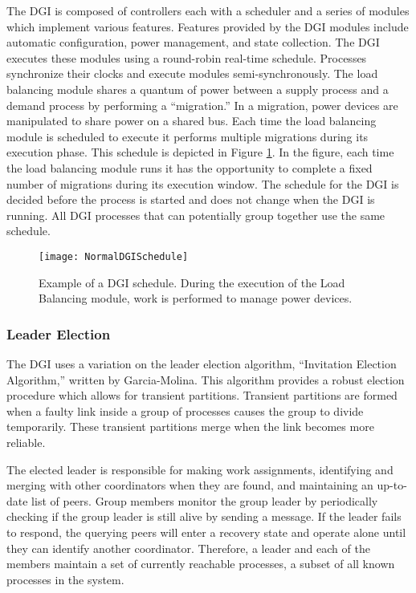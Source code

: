 The DGI is composed of controllers each with a scheduler and a series of modules which implement various features.
Features provided by the DGI modules include automatic configuration, power management, and state collection.
The \ac{DGI} executes these modules using a round-robin real-time schedule.
Processes synchronize their clocks and execute modules semi-synchronously.
The load balancing module shares a quantum of power between a supply process and a demand process by performing a ``migration.''
In a migration, power devices are manipulated to share power on a shared bus.
Each time the load balancing module is scheduled to execute it performs multiple migrations during its execution phase.
This schedule is depicted in Figure \ref{fig:normal-schedule}.
In the figure, each time the load balancing module runs it has the opportunity to complete a fixed number of migrations during its execution window.
The schedule for the \ac{DGI} is decided before the process is started and does not change when the \ac{DGI} is running.
All \ac{DGI} processes that can potentially group together use the same schedule.

\begin{figure}
\centering
\texttt{[image: NormalDGISchedule]}
\caption{Example of a \ac{DGI} schedule. During the execution of the Load Balancing module, work is performed to manage power devices.} \label{fig:normal-schedule}
\end{figure}

\subsubsection{Leader Election}

The \ac{DGI} uses a variation on the leader election algorithm, ``Invitation Election Algorithm,'' written by Garcia-Molina\cite{INVITATIONELECTION}.
This algorithm provides a robust election procedure which allows for transient partitions.
Transient partitions are formed when a faulty link inside a group of processes causes the group to divide temporarily.
These transient partitions merge when the link becomes more reliable.

The elected leader is responsible for making work assignments, identifying and merging with other coordinators when they are found, and maintaining an up-to-date list of peers.
Group members monitor the group leader by periodically checking if the group leader is still alive by sending a message.
If the leader fails to respond, the querying peers will enter a recovery state and operate alone until they can identify another coordinator.
Therefore, a leader and each of the members maintain a set of currently reachable processes, a subset of all known processes in the system.

